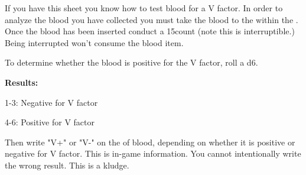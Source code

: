 \documentclass[green]{guildcamp4}
\begin{document}
\name{\gVFactor{}}

If you have this sheet you know how to test blood for a V factor. In order to analyze the blood you have collected you must take the blood to the \sBloodAnalyzer{} within the \pBioLabC{}. 
Once the blood has been inserted conduct a 15count (note this is interruptible.) Being interrupted won't consume the blood item.

To determine whether the blood is positive for the V factor, roll a d6.

{\bf Results:}

1-3: Negative for V factor

4-6: Positive for V factor

Then write "V+" or "V-" on the \iTestTube{} of blood, depending on whether it is positive or negative for V factor. This is in-game information. You cannot intentionally write the wrong result. This is a kludge.
\end{document}
